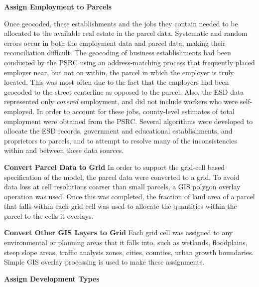 \begin{description}
\item{\textbf{Assign Employment to Parcels}}

Once geocoded, these establishments and the jobs they contain
needed to be allocated to the available real estate in the parcel
data. Systematic and random errors occur in both the employment
data and parcel data, making their reconciliation difficult. The
geocoding of business establishments had been conducted by the
PSRC using an address-matching process that frequently placed
employer near, but not on within, the parcel in which the employer
is truly located. This was most often due to the fact that the
employers had been geocoded to the street centerline as opposed to
the parcel.  Also, the ESD data represented only \emph{covered}
employment, and did not include workers who were self-employed. In
order to account for these jobs, county-level estimates of total
employment were obtained from the PSRC. Several algorithms were
developed to allocate the ESD records, government and educational
establishments, and proprietors to parcels, and to attempt to
resolve many of the inconsistencies within and between these data
sources.

\item{\textbf{Convert Parcel Data to Grid}} In order to support
the grid-cell based specification of the model, the parcel data
were converted to a grid. To avoid data loss at cell resolutions
coarser than small parcels, a GIS polygon overlay operation was
used. Once this was completed, the fraction of land area of a
parcel that falls within each grid cell was used to allocate the
quantities within the parcel to the cells it overlays.

\item{\textbf{Convert Other GIS Layers to Grid}} Each grid cell
was assigned to any environmental or planning areas that it falls
into, such as wetlands, floodplains, steep slope areas, traffic
analysis zones, cities, counties, urban growth boundaries. Simple
GIS overlay processing is used to make these assignments.

\item{\textbf{Assign Development Types}}


\end{description}
